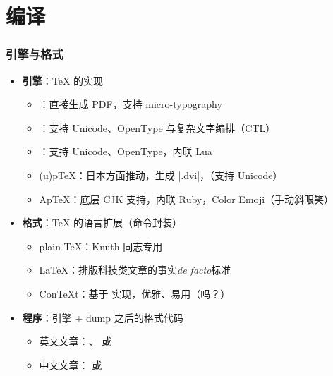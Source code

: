 \section{编译}

\begin{frame}[fragile]
  \frametitle{引擎与格式}
  \begin{itemize}
    \item<+-> \textbf{引擎}：\TeX{} 的实现

      \begin{itemize}
        \item \pdfTeX{}：直接生成 PDF，支持 micro-typography
        \item \XeTeX{}：支持 Unicode、OpenType 与复杂文字编排（CTL）
        \item \LuaTeX{}：支持 Unicode、OpenType，内联 Lua
        \item (u)p\TeX{}：日本方面推动，生成 |.dvi|，（支持 Unicode）
        \item Ap\TeX{}：底层 CJK 支持，内联 Ruby，Color Emoji（手动斜眼笑）
      \end{itemize}

    \item<+-> \textbf{格式}：\TeX{} 的语言扩展（命令封装）

      \begin{itemize}
        \item plain \TeX{}：Knuth 同志专用
        \item \LaTeX{}：排版科技类文章的事实\textit{de facto}标准
        \item Con\TeX t：基于 \LuaTeX{} 实现，优雅、易用（吗？）
      \end{itemize}

    \item<+-> \textbf{程序}：引擎 + dump 之后的格式代码

      \begin{itemize}
        \item \alert{英文文章：\pdfLaTeX{}、\XeLaTeX{} 或 \LuaLaTeX{}}
        \item \alert{中文文章：\XeLaTeX{} 或 \LuaLaTeX{}}
      \end{itemize}
  \end{itemize}
\end{frame}

